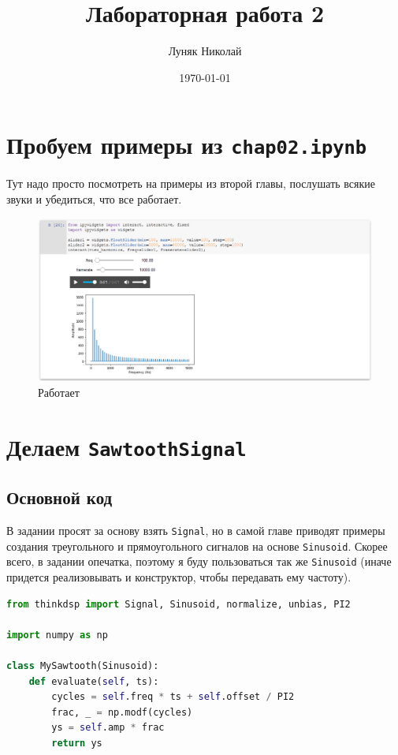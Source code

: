 \documentclass[a4paper,12pt]{report}
\author{Луняк Николай}
\title{Лабораторная работа 2}
\date{\today}
\begin{document}
    \maketitle
    \tableofcontents
    \listoffigures
    \lstlistoflistings
    
    \chapter{Пробуем примеры из \texttt{chap02.ipynb}}
    
    Тут надо просто посмотреть на примеры из второй главы, послушать всякие звуки и убедиться, что все работает.
    
    \begin{figure}[H]
        \centering
        \includegraphics[width=\textwidth]{ex1_it_works.png}
        \caption{Работает}
        \label{fig:ex1_it_works}
    \end{figure}
    
    \chapter{Делаем \texttt{SawtoothSignal}}
    
    \section{Основной код}
    
    В задании просят за основу взять \texttt{Signal}, но в самой главе приводят примеры создания треугольного и прямоугольного сигналов на основе \texttt{Sinusoid}. Скорее всего, в задании опечатка, поэтому я буду пользоваться так же \texttt{Sinusoid} (иначе придется реализовывать и конструктор, чтобы передавать ему частоту).
    
\begin{lstlisting}[language=Python,caption=Реализация своего пилообразного сигнала]
from thinkdsp import Signal, Sinusoid, normalize, unbias, PI2

import numpy as np

class MySawtooth(Sinusoid):
    def evaluate(self, ts):
        cycles = self.freq * ts + self.offset / PI2
        frac, _ = np.modf(cycles)
        ys = self.amp * frac 
        return ys
\end{lstlisting}
\end{document}
